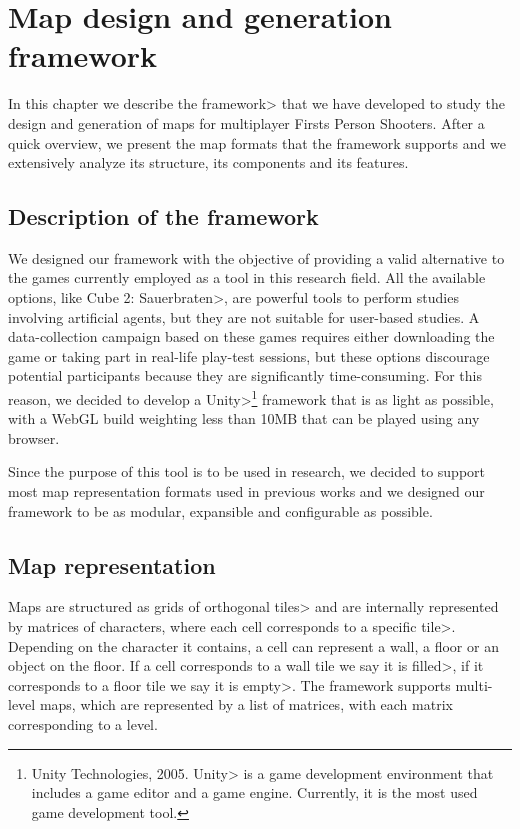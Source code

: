 \chapter{Map design and generation framework}


In this chapter we describe the \<framework> that we have developed to study the design and generation of maps for multiplayer Firsts Person Shooters. After a quick overview, we present the map formats that the framework supports and we extensively analyze its structure, its components and its features.


\section{Description of the framework}

We designed our framework with the objective of providing a valid alternative to the games currently employed as a tool in this research field. All the available options, like \<Cube 2: Sauerbraten>, are powerful tools to perform studies involving artificial agents, but they are not suitable for user-based studies. A data-collection campaign based on these games requires either downloading the game or taking part in real-life play-test sessions, but these options discourage potential participants because they are significantly time-consuming. For this reason, we decided to develop a \<Unity>\footnote{Unity Technologies, 2005. \<Unity> is a game development environment that includes a game editor and a game engine. Currently, it is the most used game development tool.} framework that is as light as possible, with a WebGL build weighting less than 10MB that can be played using any browser.

\par

Since the purpose of this tool is to be used in research, we decided to support most map representation formats used in previous works and we designed our framework to be as modular, expansible and configurable as possible.


\section{Map representation}

Maps are structured as grids of orthogonal \<tiles> and are internally represented  by matrices of characters, where each cell corresponds to a specific \<tile>. Depending on the character it contains, a cell can represent a wall, a floor or an object on the floor. If a cell corresponds to a wall tile we say it is \<filled>, if it corresponds to a floor tile we say it is \<empty>. The framework supports multi-level maps, which are represented by a list of matrices, with each matrix corresponding to a level.

